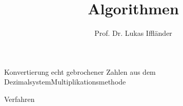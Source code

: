 \documentclass[xelatex,aspectratio=169]{beamer}
\title{Algorithmen}
\author{Prof. Dr. Lukas Iffländer}
\institute{HTW Dresden}
\date{}
\begin{document}
\begin{frame}[t]{Konvertierung echt gebrochener Zahlen aus dem Dezimalsystem}{Multiplikationsmethode}
  \begin{block}{Verfahren}


  \end{block}
\end{frame}



\end{document}
